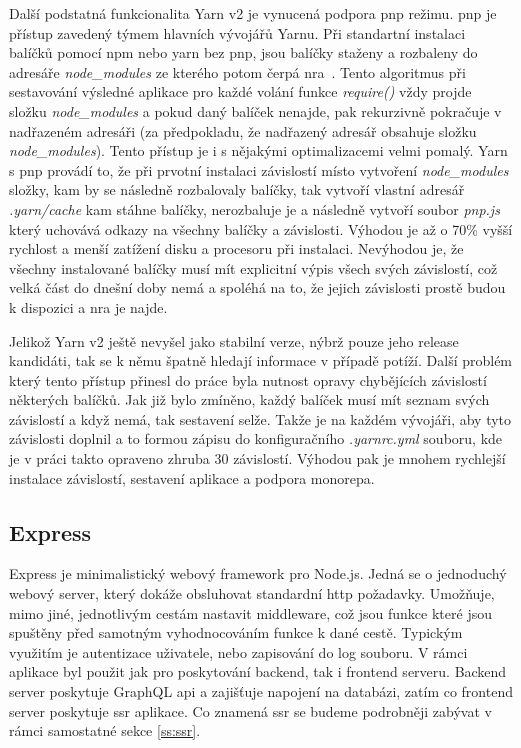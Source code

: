 Další podstatná funkcionalita Yarn v2 je vynucená podpora \acrfull{pnp} režimu. \acrshort{pnp} je přístup zavedený týmem hlavních vývojářů Yarnu. Při standartní instalaci balíčků pomocí npm nebo yarn bez pnp, jsou balíčky staženy a rozbaleny do adresáře \emph{node\_modules} ze kterého potom čerpá \acrfull{nra}~\cite{joyentinc_1_noderesolutionalgorithm}. Tento algoritmus při sestavování výsledné aplikace pro každé volání funkce \emph{require()} vždy projde složku \emph{node\_modules} a pokud daný balíček nenajde, pak rekurzivně pokračuje v nadřazeném adresáři (za předpokladu, že nadřazený adresář obsahuje složku \emph{node\_modules}). Tento přístup je i s nějakými optimalizacemi velmi pomalý. Yarn s \acrshort{pnp} provádí to, že při prvotní instalaci závislostí místo vytvoření \emph{node\_modules} složky, kam by se následně rozbalovaly balíčky, tak vytvoří vlastní adresář \emph{.yarn/cache} kam stáhne balíčky, nerozbaluje je a následně vytvoří soubor \emph{pnp.js} který uchovává odkazy na všechny balíčky a závislosti. Výhodou je až o 70\% vyšší rychlost a menší zatížení disku a procesoru při instalaci. Nevýhodou je, že všechny instalované balíčky musí mít explicitní výpis všech svých závislostí, což velká část do dnešní doby nemá a spoléhá na to, že jejich závislosti prostě budou k dispozici a \acrshort{nra} je najde.

Jelikož Yarn v2 ještě nevyšel jako stabilní verze, nýbrž pouze jeho release kandidáti, tak se k němu špatně hledají informace v případě potíží. Další problém který tento přístup přinesl do práce byla nutnost opravy chybějících závislostí některých balíčků. Jak již bylo zmíněno, každý balíček musí mít seznam svých závislostí a když nemá, tak sestavení selže. Takže je na každém vývojáři, aby tyto závislosti doplnil a to formou zápisu do konfiguračního \emph{.yarnrc.yml} souboru, kde je v práci takto opraveno zhruba 30 závislostí. Výhodou pak je mnohem rychlejší instalace závislostí, sestavení aplikace a podpora monorepa.

\subsection{Express}
\label{ss:express}
Express je minimalistický webový framework pro Node.js. Jedná se o jednoduchý webový server, který dokáže obsluhovat standardní http požadavky. Umožňuje, mimo jiné, jednotlivým cestám nastavit middleware, což jsou funkce které jsou spuštěny před samotným vyhodnocováním funkce k dané cestě. Typickým využitím je autentizace uživatele, nebo zapisování do log souboru. V rámci aplikace byl použit jak pro poskytování backend, tak i frontend serveru. Backend server poskytuje GraphQL \acrshort{api} a zajišťuje napojení na databázi, zatím co frontend server poskytuje \acrfull{ssr} aplikace. Co znamená \acrfull{ssr} se budeme podrobněji zabývat v rámci samostatné sekce \ref{ss:ssr}.

